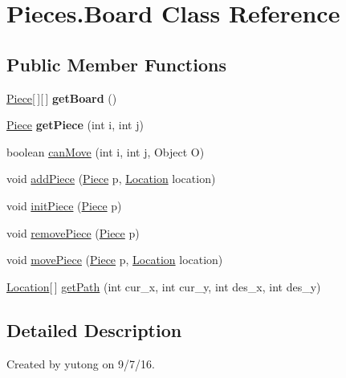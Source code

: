 \hypertarget{classPieces_1_1Board}{\section{Pieces.\-Board Class Reference}
\label{classPieces_1_1Board}
}
\subsection*{Public Member Functions}
\begin{DoxyCompactItemize}
\item 
\hypertarget{classPieces_1_1Board_a5b88acf39af28ae35203fdc2726b5d30}{\hyperlink{classPieces_1_1Piece}{Piece}\mbox{[}$\,$\mbox{]}\mbox{[}$\,$\mbox{]} {\bfseries get\-Board} ()}\label{classPieces_1_1Board_a5b88acf39af28ae35203fdc2726b5d30}

\item 
\hypertarget{classPieces_1_1Board_a2417b574df42d2d2fe0bb30b2362829f}{\hyperlink{classPieces_1_1Piece}{Piece} {\bfseries get\-Piece} (int i, int j)}\label{classPieces_1_1Board_a2417b574df42d2d2fe0bb30b2362829f}

\item 
boolean \hyperlink{classPieces_1_1Board_aea9bbc7c7ba0a38264e2bccb53b57944}{can\-Move} (int i, int j, Object O)
\item 
void \hyperlink{classPieces_1_1Board_abf2357a58cfc3dc41a70538203185e85}{add\-Piece} (\hyperlink{classPieces_1_1Piece}{Piece} p, \hyperlink{classPieces_1_1Location}{Location} location)
\item 
void \hyperlink{classPieces_1_1Board_a7adb66ee30f16a87e8857d936de44610}{init\-Piece} (\hyperlink{classPieces_1_1Piece}{Piece} p)
\item 
void \hyperlink{classPieces_1_1Board_a01edc50a8996328e62a476a363c3901d}{remove\-Piece} (\hyperlink{classPieces_1_1Piece}{Piece} p)
\item 
void \hyperlink{classPieces_1_1Board_af5e7fe0f867051c7445abbec349600eb}{move\-Piece} (\hyperlink{classPieces_1_1Piece}{Piece} p, \hyperlink{classPieces_1_1Location}{Location} location)
\item 
\hyperlink{classPieces_1_1Location}{Location}\mbox{[}$\,$\mbox{]} \hyperlink{classPieces_1_1Board_a7e38dc282c0bdcc090e4a9ac3a632943}{get\-Path} (int cur\-\_\-x, int cur\-\_\-y, int des\-\_\-x, int des\-\_\-y)
\end{DoxyCompactItemize}


\subsection{Detailed Description}
Created by yutong on 9/7/16. 

